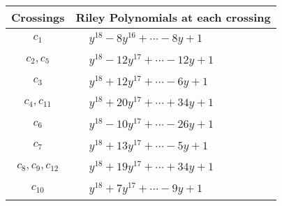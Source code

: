 \documentclass[1p]{elsarticle_modified}
\theoremstyle{definition}
\begin{document}
\begin{tabular}{m{50pt}|m{274pt}}
Crossings & \hspace{64pt}Riley Polynomials at each crossing \\
\hline $$\begin{aligned}c_{1}\end{aligned}$$&$\begin{aligned}
&y^{18}-8 y^{16}+\cdots-8 y+1
\end{aligned}$\\
\hline $$\begin{aligned}c_{2},c_{5}\end{aligned}$$&$\begin{aligned}
&y^{18}-12 y^{17}+\cdots-12 y+1
\end{aligned}$\\
\hline $$\begin{aligned}c_{3}\end{aligned}$$&$\begin{aligned}
&y^{18}+12 y^{17}+\cdots-6 y+1
\end{aligned}$\\
\hline $$\begin{aligned}c_{4},c_{11}\end{aligned}$$&$\begin{aligned}
&y^{18}+20 y^{17}+\cdots+34 y+1
\end{aligned}$\\
\hline $$\begin{aligned}c_{6}\end{aligned}$$&$\begin{aligned}
&y^{18}-10 y^{17}+\cdots-26 y+1
\end{aligned}$\\
\hline $$\begin{aligned}c_{7}\end{aligned}$$&$\begin{aligned}
&y^{18}+13 y^{17}+\cdots-5 y+1
\end{aligned}$\\
\hline $$\begin{aligned}c_{8},c_{9},c_{12}\end{aligned}$$&$\begin{aligned}
&y^{18}+19 y^{17}+\cdots+34 y+1
\end{aligned}$\\
\hline $$\begin{aligned}c_{10}\end{aligned}$$&$\begin{aligned}
&y^{18}+7 y^{17}+\cdots-9 y+1
\end{aligned}$\\
\hline
\end{tabular}\\~\\
\end{document}
